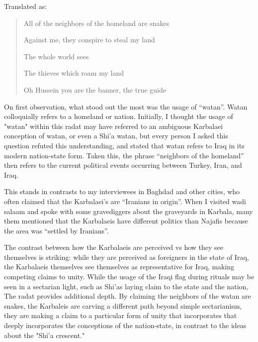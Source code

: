 Translated as: 
\begin{quote}
All of the neighbors of the homeland are snakes

Against me, they conspire to steal my land

The whole world sees

The thieves which roam my land

Oh Hussein you are the banner, the true guide
\end{quote}

On first observation, what stood out the most was the usage of “watan”. Watan colloquially refers to a homeland or nation. Initially, I thought the usage of "watan" within this radat may have referred to an ambiguous Karbalaei conception of watan, or even a Shi'a watan, but every person I asked this question refuted this understanding, and stated that watan refers to Iraq in its modern nation-state form. Taken this, the phrase “neighbors of the homeland” then refers to the current political events occurring between Turkey, Iran, and Iraq. 

This stands in contrasts to my interviewees in Baghdad and other cities, who often claimed that the Karbalaei’s are “Iranians in origin”. When I visited wadi salaam and spoke with some gravediggers about the graveyards in Karbala, many them mentioned that the Karbalaeis have different politics than Najafis because the area was “settled by Iranians”. 

The contrast between how the Karbalaeis are perceived vs how they see themselves is striking: while they are perceived as foreigners in the state of Iraq, the Karbalaeis themselves see themselves as representative for Iraq, making competing claims to unity. While the usage of the Iraqi flag during rituals may be seen in a sectarian light, such as Shi'as laying claim to the state and the nation, The radat provides additional depth. By claiming the neighbors of the watan are snakes, the Karbaleis are carving a different path beyond simple sectarianism, they are making a claim to a particular form of unity that incorporates that deeply incorporates the conceptions of the nation-state, in contrast to the ideas about the "Shi'a crescent." 

